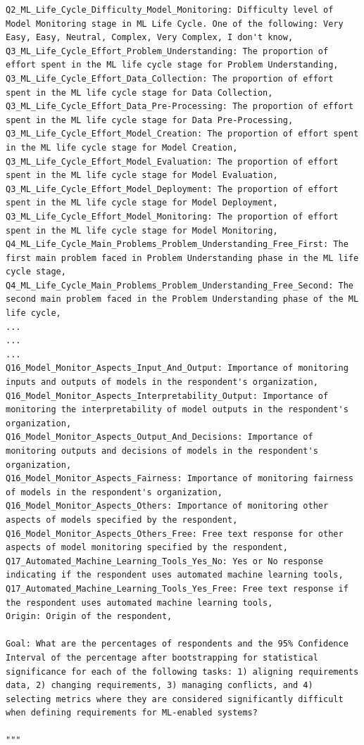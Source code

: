 \begin{verbatim}
Q2_ML_Life_Cycle_Difficulty_Model_Monitoring: Difficulty level of Model Monitoring stage in ML Life Cycle. One of the following: Very Easy, Easy, Neutral, Complex, Very Complex, I don't know,
Q3_ML_Life_Cycle_Effort_Problem_Understanding: The proportion of effort spent in the ML life cycle stage for Problem Understanding,
Q3_ML_Life_Cycle_Effort_Data_Collection: The proportion of effort spent in the ML life cycle stage for Data Collection,
Q3_ML_Life_Cycle_Effort_Data_Pre-Processing: The proportion of effort spent in the ML life cycle stage for Data Pre-Processing,
Q3_ML_Life_Cycle_Effort_Model_Creation: The proportion of effort spent in the ML life cycle stage for Model Creation,
Q3_ML_Life_Cycle_Effort_Model_Evaluation: The proportion of effort spent in the ML life cycle stage for Model Evaluation,
Q3_ML_Life_Cycle_Effort_Model_Deployment: The proportion of effort spent in the ML life cycle stage for Model Deployment,
Q3_ML_Life_Cycle_Effort_Model_Monitoring: The proportion of effort spent in the ML life cycle stage for Model Monitoring,
Q4_ML_Life_Cycle_Main_Problems_Problem_Understanding_Free_First: The first main problem faced in Problem Understanding phase in the ML life cycle stage,
Q4_ML_Life_Cycle_Main_Problems_Problem_Understanding_Free_Second: The second main problem faced in the Problem Understanding phase of the ML life cycle,
...
...
...
Q16_Model_Monitor_Aspects_Input_And_Output: Importance of monitoring inputs and outputs of models in the respondent's organization,
Q16_Model_Monitor_Aspects_Interpretability_Output: Importance of monitoring the interpretability of model outputs in the respondent's organization,
Q16_Model_Monitor_Aspects_Output_And_Decisions: Importance of monitoring outputs and decisions of models in the respondent's organization,
Q16_Model_Monitor_Aspects_Fairness: Importance of monitoring fairness of models in the respondent's organization,
Q16_Model_Monitor_Aspects_Others: Importance of monitoring other aspects of models specified by the respondent,
Q16_Model_Monitor_Aspects_Others_Free: Free text response for other aspects of model monitoring specified by the respondent,
Q17_Automated_Machine_Learning_Tools_Yes_No: Yes or No response indicating if the respondent uses automated machine learning tools,
Q17_Automated_Machine_Learning_Tools_Yes_Free: Free text response if the respondent uses automated machine learning tools,
Origin: Origin of the respondent,

Goal: What are the percentages of respondents and the 95% Confidence Interval of the percentage after bootstrapping for statistical significance for each of the following tasks: 1) aligning requirements data, 2) changing requirements, 3) managing conflicts, and 4) selecting metrics where they are considered significantly difficult when defining requirements for ML-enabled systems?

"""
\end{verbatim}


